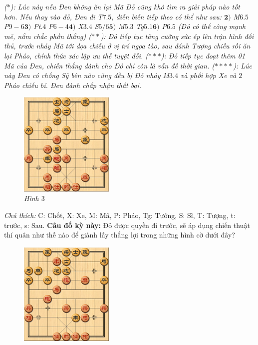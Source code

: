\begin{multicols}{2}
	\vskip 0.1cm
	\textit{($*$): Lúc này nếu Đen không ăn lại Mã Đỏ cũng khó tìm ra giải pháp nào tốt hơn. Nếu thay vào đỏ, Đen đi T$7.5$, diễn biến tiếp theo có thể như sau: $\pmb{2)}$ M$6.5$ P$9-6$\quad $\pmb{3)}$ Pt$.4$ P$6-4$\quad $\pmb{4)}$ X$3.4$ S$5/6$\quad $\pmb{5)}$ M$5.3$ Tg$5.1$\quad $\pmb{6)}$ P$6.5$ (Đỏ có thế công mạnh mẽ, nắm chắc phần thắng)
	\vskip 0.1cm
	($**$): Đỏ tiếp tục tăng cường sức ép lên trận hình đối thủ, trước nhảy Mã tới dọa chiếu ở vị trí ngọa tào, sau đánh Tượng chiếu rồi ăn lại Pháo, chính thức xác lập ưu thế tuyệt đối.
	\vskip 0.1cm
	($***$): Đỏ tiếp tục đoạt thêm 01 Mã của Đen, chiến thắng dành cho Đỏ chỉ còn là vấn đề thời gian.
	\vskip 0.1cm
	($****$): Lúc này Đen có chống Sỹ bên nào cũng đều bị Đỏ nhảy M$3.4$ và phối hợp Xe và $2$ Pháo chiếu bí. Đen đành chấp nhận thất bại.}
	\begin{figure}[H]
		\vspace*{-5pt}
		\centering
		\captionsetup{labelformat= empty, justification=centering}
		\includegraphics[width= 0.4\textwidth]{3}
		\caption{\small\textit{\color{gocco}Hình $3$}}
		\vspace*{-10pt}
	\end{figure}
	\textit{Chú thích:} C: Chốt, X: Xe, M: Mã, P: Pháo, Tg: Tướng, S: Sĩ, T: Tượng, t: trước, s: Sau. 
	\vskip 0.1cm
	\textbf{\color{gocco}Câu đố kỳ này:} Đỏ được quyền đi trước, sẽ áp dụng chiến thuật thí quân như thế nào để giành lấy thắng lợi trong những hình cờ dưới đây?
	\begin{figure}[H]
		\vspace*{5pt}
		\centering
		\captionsetup{labelformat= empty, justification=centering}
		\includegraphics[width= 0.4\textwidth]{4}

\end{figure}
\end{multicols}
